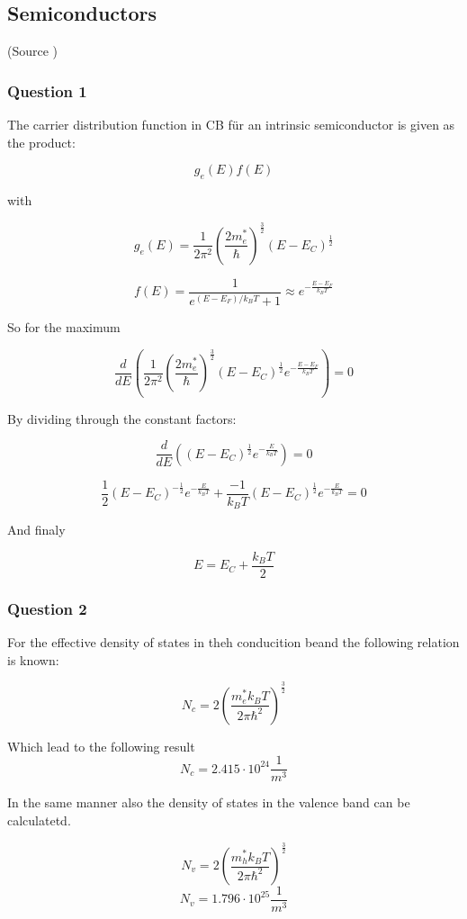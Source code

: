 \subsection{Semiconductors} \label{chap3}

(Source \cite[Elementary Solid State Physics Chapter 6]{elementary_SSP})

\subsubsection*{Question 1}
The carrier distribution function in CB für an intrinsic semiconductor
is given as the product:

$$g_e(E) f(E)$$

with

$$g_e(E) = \frac{1}{2\pi^2} \left( \frac{2m_e^*}{\hbar} \right)^\frac{3}{2} (E-E_C)^\frac{1}{2}$$

$$f(E) = \frac{1}{e^{(E-E_F)/k_BT}+1}  \approx e^{-\frac{E-E_F}{k_BT}}$$

So for the maximum 

$$\frac{d}{dE} \left(\frac{1}{2\pi^2} \left( \frac{2m_e^*}{\hbar} \right)^\frac{3}{2} (E-E_C)^\frac{1}{2} e^{-\frac{E-E_F}{k_BT}} \right) = 0$$

By dividing through the constant factors:

$$\frac{d}{dE} \left( (E-E_C)^\frac{1}{2} e^{-\frac{E}{k_BT}} \right) = 0$$

$$\frac{1}{2} (E-E_C)^{-\frac{1}{2}} e^{-\frac{E}{k_BT}} + \frac{-1}{k_BT} (E-E_C)^\frac{1}{2} e^{-\frac{E}{k_BT}} = 0$$

And finaly

$$E = E_C + \frac{k_BT}{2}$$


\subsubsection*{Question 2}

For the effective density of states in theh conducition beand 
the following relation is known:

$$ N_c = 2 \left( \frac{m_e^*k_BT}{2\pi\hbar^2}\right)^{\frac{3}{2}}$$

Which lead to the following result
$$ N_c = 2.415 \cdot 10^{24} \frac{1}{m^3}$$

In the same manner also the density of states in the valence band can be
calculatetd.

$$ N_v = 2 \left( \frac{m_h^*k_BT}{2\pi\hbar^2}\right)^{\frac{3}{2}}$$
$$ N_v = 1.796 \cdot 10^{25} \frac{1}{m^3}$$

